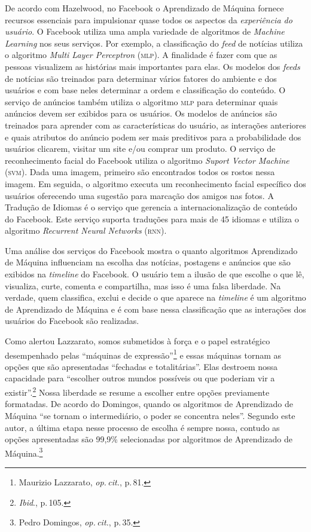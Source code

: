 De acordo com Hazelwood, no Facebook o Aprendizado de
Máquina fornece recursos essenciais para impulsionar quase todos os
aspectos da \textit{experiência do usuário}. O Facebook utiliza uma ampla
variedade de algoritmos de \textit{Machine Learning} nos seus serviços.
Por exemplo, a classificação do \textit{feed} de notícias utiliza o
algoritmo \textit{Multi Layer Perceptron} (\textsc{mlp}). A finalidade é fazer
com que as pessoas visualizem as histórias mais importantes para elas.
Os modelos dos \textit{feeds} de notícias são treinados para determinar
vários fatores do ambiente e dos usuários e com base neles determinar a
ordem e classificação do conteúdo. O serviço de anúncios também utiliza
o algoritmo \textsc{mlp} para determinar
quais anúncios devem ser exibidos para os usuários. Os modelos de
anúncios são treinados para aprender com as características do usuário,
as interações anteriores e quais atributos do anúncio podem ser mais
preditivos para a probabilidade dos usuários clicarem, visitar um site
e/ou comprar um produto. O serviço de reconhecimento facial do Facebook
utiliza o algoritmo \textit{Suport Vector Machine} (\textsc{svm}). Dada uma
imagem, primeiro são encontrados todos os rostos nessa imagem. Em
seguida, o algoritmo executa um reconhecimento facial específico dos
usuários oferecendo uma sugestão para marcação dos amigos nas fotos. A
Tradução de Idiomas é o serviço que gerencia a internacionalização de
conteúdo do Facebook. Este serviço suporta traduções para mais de 45
idiomas e utiliza o algoritmo \textit{Recurrent Neural Networks}
(\textsc{rnn}).

Uma análise dos serviços do Facebook mostra o quanto algoritmos
Aprendizado de Máquina influenciam na escolha das notícias, postagens e
anúncios que são exibidos na \textit{timeline} do Facebook. O usuário tem
a ilusão de que escolhe o que lê, visualiza, curte, comenta e
compartilha, mas isso é uma falsa liberdade. Na verdade, quem
classifica, exclui e decide o que aparece na \textit{timeline} é um
algoritmo de Aprendizado de Máquina e é com base nessa classificação que
as interações dos usuários do Facebook são realizadas.

Como alertou Lazzarato, somos submetidos à força e o papel
estratégico desempenhado pelas ``máquinas de expressão''\footnote{Maurizio Lazzarato, \textit{op.\,cit.}, p.\,81.} e essas
máquinas tornam as opções que são apresentadas ``fechadas e
totalitárias''. Elas destroem nossa capacidade para ``escolher outros
mundos possíveis ou que poderiam vir a existir''.\footnote{\textit{Ibid}., p.\,105.} Nossa
liberdade se resume a escolher entre opções previamente formatadas. De
acordo do Domingos, quando os algoritmos de Aprendizado de
Máquina ``se tornam o intermediário, o poder se concentra neles''.
Segundo este autor, a última etapa nesse processo de escolha é sempre
nossa, contudo as opções apresentadas são 99,9\% selecionadas por
algoritmos de Aprendizado de Máquina.\footnote{Pedro Domingos, \textit{op.\,cit.}, p.\,35.}

